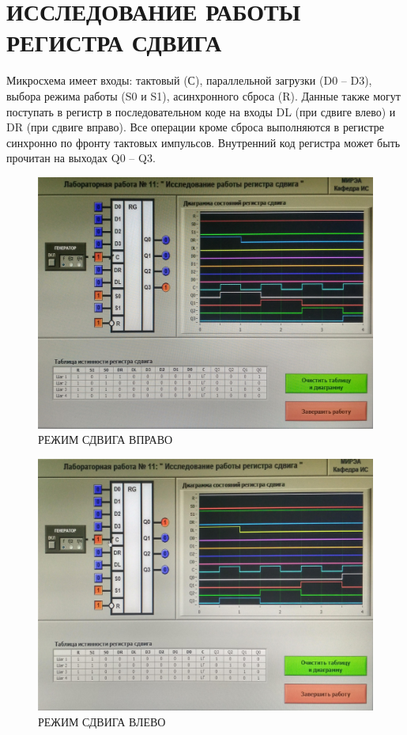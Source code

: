 \section{ИССЛЕДОВАНИЕ РАБОТЫ РЕГИСТРА СДВИГА}

Микросхема имеет входы: тактовый (С), параллельной загрузки (D0 –
D3), выбора режима работы (S0 и S1), асинхронного сброса (R). Данные
также могут поступать в регистр в последовательном коде на входы DL
(при сдвиге влево) и DR (при сдвиге вправо). Все операции кроме сброса
выполняются в регистре синхронно по фронту тактовых импульсов. Внутренний код регистра может быть прочитан на выходах Q0 – Q3.

\begin{figure}[H]
	\centering
	\includegraphics[width=0.95\linewidth]{imgs/11/1.jpg}
	\caption{РЕЖИМ СДВИГА ВПРАВО}
	\label{fig:11_1}
\end{figure}

\begin{figure}[H]
	\centering
	\includegraphics[width=0.95\linewidth]{imgs/11/2.jpg}
	\caption{РЕЖИМ СДВИГА ВЛЕВО}
	\label{fig:11_2}
\end{figure}

